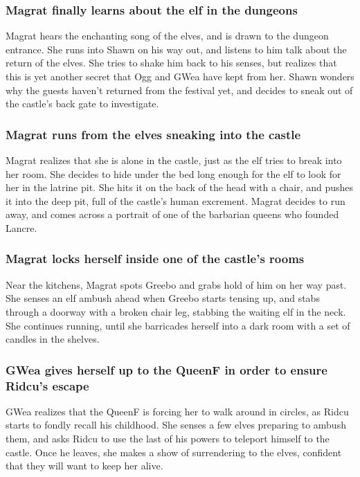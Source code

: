 \subsubsection{\Gls{Magrat} finally learns about the elf in the dungeons}
\Gls{Magrat} hears the enchanting song of the elves, and is drawn to the dungeon entrance. She
runs into \Gls{Shawn} on his way out, and listens to him talk about the return of the elves. She
tries to shake him back to his senses, but realizes that this is yet another secret that \Gls{Ogg}
and \Gls{GWea} have kept from her. \Gls{Shawn} wonders why the guests haven't returned from the
festival yet, and decides to sneak out of the castle's back gate to investigate.

\subsubsection{\Gls{Magrat} runs from the elves sneaking into the castle}
\Gls{Magrat} realizes that she is alone in the castle, just as the elf tries to break into her room.
She decides to hide under the bed long enough for the elf to look for her in the latrine pit. She
hits it on the back of the head with a chair, and pushes it into the deep pit, full of the castle's
human excrement. \Gls{Magrat} decides to run away, and comes across a portrait of one of the
barbarian queens who founded Lancre.

\subsubsection{\Gls{Magrat} locks herself inside one of the castle's rooms}
Near the kitchens, \Gls{Magrat} spots \Gls{Greebo} and grabs hold of him on her way past. She senses
an elf ambush ahead when \Gls{Greebo} starts tensing up, and stabs through a doorway with a broken
chair leg, stabbing the waiting elf in the neck. She continues running, until she barricades herself
into a dark room with a set of candles in the shelves.

\subsubsection{\Gls{GWea} gives herself up to the \Gls{QueenF} in order to ensure \Gls{Ridcu}'s
    escape}
\Gls{GWea} realizes that the \Gls{QueenF} is forcing her to walk around in circles, as \Gls{Ridcu}
starts to fondly recall his childhood. She senses a few elves preparing to ambush them, and asks
\Gls{Ridcu} to use the last of his powers to teleport himself to the castle. Once he leaves, she
makes a show of surrendering to the elves, confident that they will want to keep her alive.

